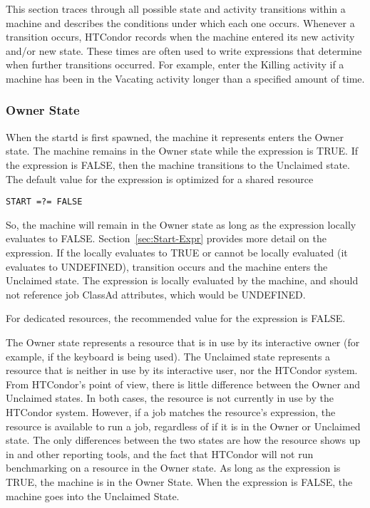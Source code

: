 This section traces through all possible state and activity
transitions within a machine and describes the conditions under which
each one occurs.
Whenever a transition occurs, HTCondor records when the machine entered its
new activity and/or new state.
These times are often used to write expressions that determine
when further transitions occurred.
For example, enter the Killing activity if a machine has been in
the Vacating activity longer than a specified amount of time. 

\subsubsection{\label{sec:Owner-State}
Owner State}

When the startd is first spawned, the machine it represents enters the
Owner state. 
The machine remains in the Owner state while the
expression  is TRUE.
If the  expression is FALSE,
then the machine transitions to the Unclaimed state.
The default value for the 
 expression is optimized for a shared resource
\begin{verbatim}
START =?= FALSE
\end{verbatim}
So,
the machine will remain in the Owner state as long as the 
expression locally evaluates to FALSE.
Section~\ref{sec:Start-Expr} provides more detail on the
 expression.
If the  locally evaluates to TRUE or cannot be locally
evaluated (it evaluates to UNDEFINED), transition 
occurs and the machine enters the Unclaimed state.
The  expression is locally evaluated by the machine,
and should not reference job ClassAd attributes, which would be
UNDEFINED.

For dedicated resources, the recommended value for the 
expression is FALSE.

The Owner state represents a resource that is in use by its
interactive owner (for example, if the keyboard is being used).
The Unclaimed state represents a resource that is neither in use by
its interactive user, nor the HTCondor system.
From HTCondor's point of view, there is little difference between the
Owner and Unclaimed states.
In both cases, the resource is not currently in use by the HTCondor
system.
However, if a job matches the resource's  expression, the
resource is available to run a job, regardless of if it is in the
Owner or Unclaimed state.
The only differences between the two states are how the resource shows
up in  and other reporting tools, and the fact that
HTCondor will not run benchmarking on a resource in the Owner state.
As long as the  expression is TRUE, the machine is
in the Owner State.
When the  expression is FALSE, the machine goes into
the Unclaimed State.

